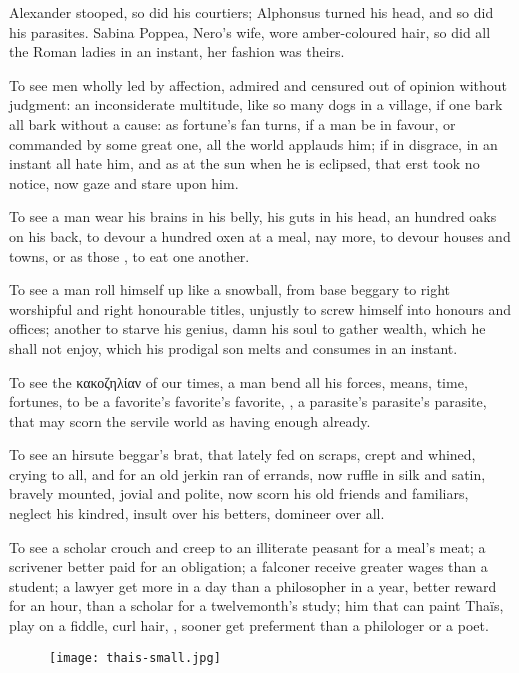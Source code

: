 Alexander stooped, so did his courtiers; Alphonsus turned
his head, and so did his parasites. Sabina Poppea, Nero's
wife, wore amber-coloured hair, so did all the Roman ladies in an instant, her
fashion was theirs.

To see men wholly led by affection, admired and censured out of opinion without
judgment: an inconsiderate multitude, like so many dogs in a village, if one
bark all bark without a cause: as fortune's fan turns, if a man be in favour,
or commanded by some great one, all the world applauds him;
if in disgrace, in an instant all hate him, and as at the
sun when he is eclipsed, that erst took no notice, now gaze and stare upon him.

To see a man wear his brains in his belly, his guts in his
head, an hundred oaks on his back, to devour a hundred oxen at a meal, nay
more, to devour houses and towns, or as those ,
to eat one another.

To see a man roll himself up like a snowball, from base beggary to right
worshipful and right honourable titles, unjustly to screw himself into honours
and offices; another to starve his genius, damn his soul to gather wealth,
which he shall not enjoy, which his prodigal son melts and consumes in an
instant. 

To see the \textgreek{κακοζηλίαν} of our times, a man bend all his forces,
means, time, fortunes, to be a favorite's favorite's favorite, \etc{}, a
parasite's parasite's parasite, that may scorn the servile world as having
enough already.

To see an hirsute beggar's brat, that lately fed on scraps, crept and whined,
crying to all, and for an old jerkin ran of errands, now ruffle in silk and
satin, bravely mounted, jovial and polite, now scorn his old friends and
familiars, neglect his kindred, insult over his betters, domineer over all.

To see a scholar crouch and creep to an illiterate peasant for a meal's meat; a
scrivener better paid for an obligation; a falconer receive greater wages than
a student; a lawyer get more in a day than a philosopher in a year, better
reward for an hour, than a scholar for a twelvemonth's study; him that can
paint Thaïs, play on a fiddle, curl hair, \etc{}, sooner
get preferment than a philologer or a poet.

\begin{figure}[bh]
  \begingroup
  \centering
  \texttt{[image: thais-small.jpg]}
  \label{fig:thais}
\end{figure}

